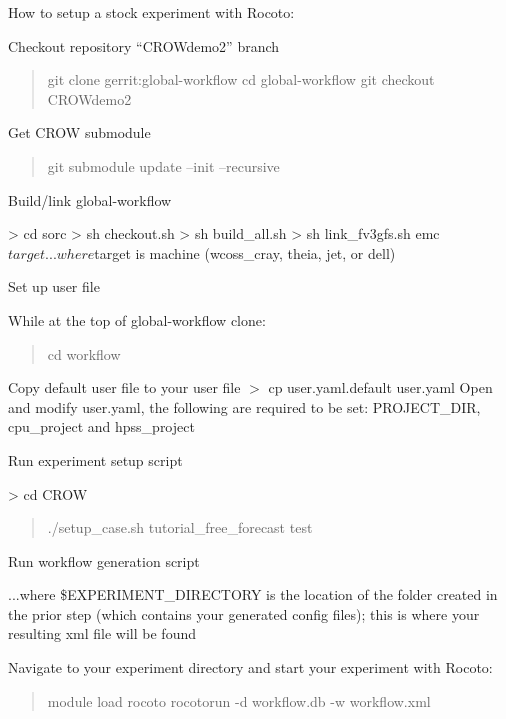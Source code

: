 How to setup a stock experiment with Rocoto\-:

Checkout repository “\-C\-R\-O\-Wdemo2” branch

\begin{quotation}
git clone gerrit\-:global-\/workflow cd global-\/workflow git checkout C\-R\-O\-Wdemo2

\end{quotation}


Get C\-R\-O\-W submodule

\begin{quotation}
git submodule update --init --recursive

\end{quotation}


Build/link global-\/workflow \begin{DoxyVerb}> cd sorc
> sh checkout.sh
> sh build_all.sh
> sh link_fv3gfs.sh emc $target
...where $target is machine (wcoss_cray, theia, jet, or dell)
\end{DoxyVerb}


Set up user file

While at the top of global-\/workflow clone\-: \begin{quotation}
cd workflow

\end{quotation}
Copy default user file to your user file $>$ cp user.\-yaml.\-default user.\-yaml Open and modify user.\-yaml, the following are required to be set\-: P\-R\-O\-J\-E\-C\-T\-\_\-\-D\-I\-R, cpu\-\_\-project and hpss\-\_\-project

Run experiment setup script \begin{DoxyVerb}> cd CROW
\end{DoxyVerb}
 \begin{quotation}
./setup\-\_\-case.sh tutorial\-\_\-free\-\_\-forecast test

\end{quotation}


Run workflow generation script 


...where \$\-E\-X\-P\-E\-R\-I\-M\-E\-N\-T\-\_\-\-D\-I\-R\-E\-C\-T\-O\-R\-Y is the location of the folder created in the prior step (which contains your generated config files); this is where your resulting xml file will be found

Navigate to your experiment directory and start your experiment with Rocoto\-:

\begin{quotation}
module load rocoto rocotorun -\/d workflow.\-db -\/w workflow.\-xml \end{quotation}
